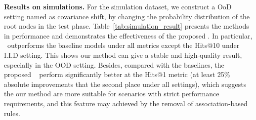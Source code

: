 \noindent
\textbf{Results on simulations.}
For the simulation dataset, we construct a OoD setting named as covariance shift, by changing the probability distribution of the root nodes in the test phase.
Table~\ref{tab:simulation_result} presents the methods in performance and demonstrates the effectiveness of the proposed \dname.
In particular, \dname~outperforms the baseline models under all metrics except the Hits@10 under I.I.D setting. This shows our method can give a stable and high-quality result, especially in the OOD setting.
Besides, compared with the baselines, the proposed \dname~ perform significantly better at the Hits@1 metric (at least 25\% absolute improvements that the second place under all settings), which suggests the our method are more suitable for scenarios with strict performance requirements, and this feature may achieved by the removal of association-based rules.

\begin{table}[h]
\caption{The results of link prediction on simulation datasets.}
\centering
\label{tab:simulation_result}
\end{table}

